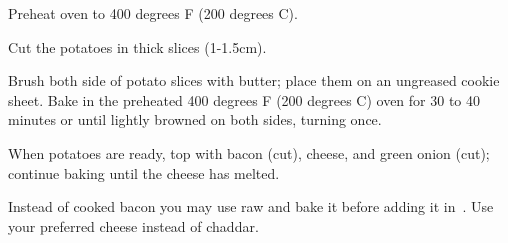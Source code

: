 
\info[servings=4,
		time = 60, 
		energy = 806, 
		urlsource = http://allrecipes.com/recipe/18344/cheese-and-bacon-potato-rounds/]{}

\begin{ingredientsh}
\end{ingredientsh}

\begin{preparation}
	\step Preheat oven to 400 degrees F (200 degrees C).
	
	\step Cut the potatoes in thick slices (1-1.5cm).
	
	\step Brush both side of potato slices with butter; place them on an ungreased cookie sheet. Bake in the preheated 400 degrees F (200 degrees C) oven for 30 to 40 minutes or until lightly browned on both sides, turning once.
	
	\step When potatoes are ready, top with bacon (cut), cheese, and green onion (cut); continue baking until the cheese has melted.
\end{preparation}


\begin{alternatives}
	\alternative Instead of cooked bacon you may use raw and bake it before adding it in~.
	\alternative Use your preferred cheese instead of chaddar.
\end{alternatives}

\begin{notes}
\end{notes}

